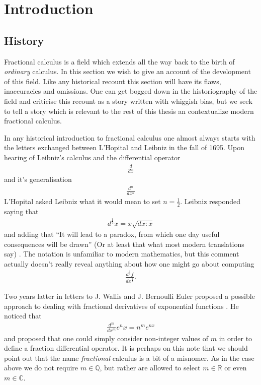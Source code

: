 \section{Introduction}
\subsection{History}
Fractional calculus is a field which extends all the way back to the birth of \emph{ordinary} calculus. In this section we wish to give an account of the development of this field. Like any historical recount this section will have its flaws, inaccuracies and omissions. One can get bogged down in the historiography of the field and criticise this recount as a story written with whiggish bias, but we seek to tell a story which is relevant to the rest of this thesis an contextualize modern fractional calculus.

In any historical introduction to fractional calculus one almost always starts with the letters exchanged between L'Hopital and Leibniz in the fall of 1695. Upon hearing of Leibniz's calculus and the differential operator
\begin{align}
    \frac{d}{dx}
\end{align}
and it's generalisation
\begin{align}
    \frac{d^n}{dx^n}
\end{align}
L'Hopital asked Leibniz what it would mean to set $ n = \frac{1}{2} $. Leibniz responded saying that 
\begin{align}
    d^\frac{1}{2}x = x\sqrt{dx:x}
\end{align} and adding that
``It will lead to a paradox, from which one day useful consequences will be drawn'' (Or at least that what most modern translations say) \cite{Abbas2012}. The notation is unfamiliar to modern mathematics, but this comment actually doesn't really reveal anything about how one might go about computing
\begin{align}
    \frac{d^\frac{1}{2}f}{dx^\frac{1}{2}}.
\end{align}

Two years latter in letters to J. Wallis and J. Bernoulli Euler proposed a possible approach to dealing with fractional derivatives of exponential functions \cite{Abbas2012}. He noticed that
\begin{align}
    \label{eq:euler_frac}
    \frac{d^m}{dx^m} e^nx = n^me^{nx} 
\end{align}
and proposed that one could simply consider non-integer values of $ m $ in order to define a fraction differential operator. 
It is perhaps on this note that we should point out that the name \emph{fractional} calculus is a bit of a misnomer. As in the case above we do not require $ m \in \mathbb{Q} $, but rather are allowed to select $ m \in \mathbb{R} $ or even $ m \in \mathbb{C} $.

